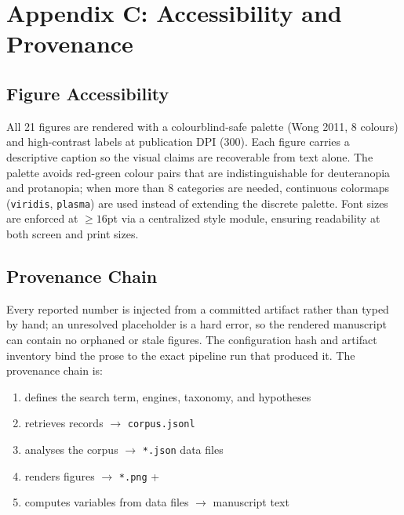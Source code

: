 \documentclass[
  english,
]{article}
\providecommand{\tightlist}{%
  \setlength{\itemsep}{0pt}\setlength{\parskip}{0pt}}
\begin{document}
\newpage

\section{Appendix C: Accessibility and
Provenance}\label{appendix-c-accessibility-and-provenance}

\subsection{Figure Accessibility}\label{figure-accessibility}

All 21 figures are rendered with a colourblind-safe palette (Wong 2011,
8 colours) and high-contrast labels at publication DPI (300). Each
figure carries a descriptive caption so the visual claims are
recoverable from text alone. The palette avoids red-green colour pairs
that are indistinguishable for deuteranopia and protanopia; when more
than 8 categories are needed, continuous colormaps (\texttt{viridis},
\texttt{plasma}) are used instead of extending the discrete palette.
Font sizes are enforced at \(\geq 16\)pt via a centralized style module,
ensuring readability at both screen and print sizes.

\subsection{Provenance Chain}\label{provenance-chain}

Every reported number is injected from a committed artifact rather than
typed by hand; an unresolved placeholder is a hard error, so the
rendered manuscript can contain no orphaned or stale figures. The
configuration hash and artifact inventory bind the prose to the exact
pipeline run that produced it. The provenance chain is:

\begin{enumerate}
\def\labelenumi{\arabic{enumi}.}
\tightlist
\item
   defines the search term, engines,
  taxonomy, and hypotheses
\item
   retrieves records \texorpdfstring{\ensuremath{\to}}{->}
  \texttt{corpus.jsonl}
\item
   analyses the corpus \texorpdfstring{\ensuremath{\to}}{->}
  \texttt{*.json} data files
\item
   renders figures \texorpdfstring{\ensuremath{\to}}{->}
  \texttt{*.png} + 
\item
   computes variables from data
  files \texorpdfstring{\ensuremath{\to}}{->} manuscript text
\end{enumerate}
\end{document}
